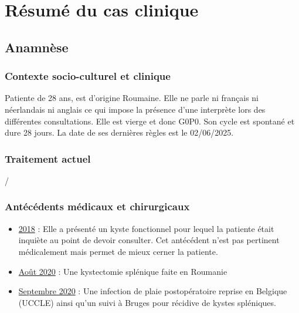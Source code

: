 \section{Résumé du cas clinique}

\subsection{Anamnèse}

\subsubsection{Contexte socio-culturel et clinique}
Patiente de 28 ans, est d’origine Roumaine. Elle ne parle ni français ni néerlandais ni anglais ce qui impose la présence d’une interprète lors des différentes consultations. Elle est vierge et donc G0P0. Son cycle est spontané et dure 28 jours. La date de ses dernières règles est le 02/06/2025.

\subsubsection{Traitement actuel}
/

\subsubsection{Antécédents médicaux et chirurgicaux}
\begin{itemize}[label=\textbullet]
    \item \underline{2018} : Elle a présenté un kyste fonctionnel pour lequel la patiente était inquiète au point de devoir consulter. Cet antécédent n’est pas pertinent médicalement mais permet de mieux cerner la patiente.
    
    \item \underline{Août 2020} : Une kystectomie splénique faite en Roumanie
    
    \item \underline{Septembre 2020} : Une infection de plaie postopératoire reprise en Belgique (UCCLE) ainsi qu’un suivi à Bruges pour récidive de kystes spléniques.
\end{itemize}

